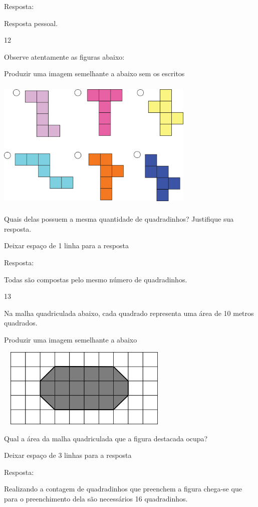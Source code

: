 \begin{escolha}
Resposta:

Resposta pessoal.

\num{12}

Observe atentamente as figuras abaixo:

Produzir uma imagem semelhante a abaixo sem os escritos

\includegraphics[width=3.72532in,height=2.47521in]{media/image59.png}

Quais delas possuem a mesma quantidade de quadradinhos? Justifique sua
resposta.

Deixar espaço de 1 linha para a resposta

Resposta:

Todas são compostas pelo mesmo número de quadradinhos.

\num{13}

Na malha quadriculada abaixo, cada quadrado representa uma área de 10
metros quadrados.

Produzir uma imagem semelhante a abaixo

\includegraphics[width=3.33333in,height=1.50517in]{media/image60.png}

Qual a área da malha quadriculada que a figura destacada ocupa?

Deixar espaço de 3 linhas para a resposta

Resposta:

Realizando a contagem de quadradinhos que preenchem a figura chega-se
que para o preenchimento dela são necessários 16 quadradinhos.


\end{escolha}

